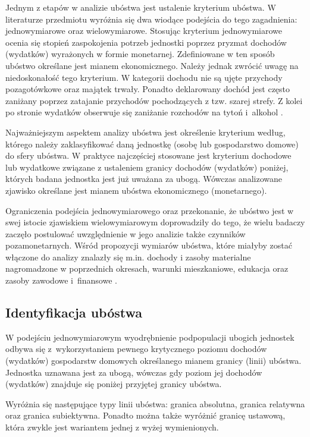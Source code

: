 Jednym z etapów w analizie ubóstwa jest ustalenie kryterium ubóstwa. W literaturze przedmiotu wyróżnia się dwa wiodące podejścia do tego zagadnienia: jednowymiarowe oraz wielowymiarowe. Stosując kryterium jednowymiarowe ocenia się stopień zaspokojenia potrzeb jednostki poprzez pryzmat dochodów (wydatków) wyrażonych w formie monetarnej. Zdefiniowane w ten sposób ubóstwo określane jest mianem ekonomicznego. Należy jednak zwrócić uwagę na niedoskonałość tego kryterium. W kategorii dochodu nie są ujęte przychody pozagotówkowe oraz majątek trwały. Ponadto deklarowany dochód jest często zaniżany poprzez zatajanie przychodów pochodzących z tzw. szarej strefy. Z kolei po stronie wydatków obserwuje się zaniżanie rozchodów na tytoń i~alkohol \citep{panek2004}.

Najważniejszym aspektem analizy ubóstwa jest określenie kryterium według, którego należy zaklasyfikować daną jednostkę (osobę lub gospodarstwo domowe) do sfery ubóstwa. W praktyce najczęściej stosowane jest kryterium dochodowe lub wydatkowe związane z ustaleniem granicy dochodów (wydatków) poniżej, których badana jednostka jest już uważana za ubogą. Wówczas analizowane zjawisko określane jest mianem ubóstwa ekonomicznego (monetarnego).

Ograniczenia podejścia jednowymiarowego oraz przekonanie, że ubóstwo jest w swej istocie zjawiskiem wielowymiarowym doprowadziły do tego, że wielu badaczy zaczęło postulować uwzględnienie w jego analizie także czynników pozamonetarnych. Wśród propozycji wymiarów ubóstwa, które miałyby zostać włączone do analizy znalazły się m.in. dochody i zasoby materialne nagromadzone w poprzednich okresach, warunki mieszkaniowe, edukacja oraz zasoby zawodowe i~finansowe \citep{panek2010}.

\subsection{Identyfikacja ubóstwa}\label{pr:identyfikacja-ubostwa}

W podejściu jednowymiarowym wyodrębnienie podpopulacji ubogich jednostek odbywa się z~wykorzystaniem pewnego krytycznego poziomu dochodów (wydatków) gospodarstw domowych określanego mianem granicy (linii) ubóstwa. Jednostka uznawana jest za ubogą, wówczas gdy poziom jej dochodów (wydatków) znajduje się poniżej przyjętej granicy ubóstwa.

Wyróżnia się następujące typy linii ubóstwa: granica absolutna, granica relatywna oraz granica subiektywna. Ponadto można także wyróżnić granicę ustawową, która zwykle jest wariantem jednej z wyżej wymienionych.

